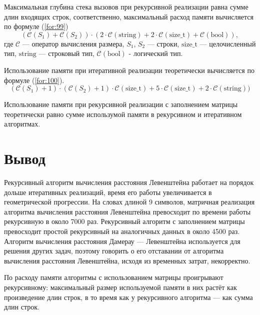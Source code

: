 Максимальная глубина стека вызовов при рекурсивной реализации равна сумме длин входящих строк, соответственно, максимальный расход памяти вычисляется по формуле (\ref{for:99})
\begin{equation}
(\mathcal{C}(S_1) + \mathcal{C}(S_2)) \cdot (2 \cdot \mathcal{C}\mathrm{(string)} + 2 \cdot \mathcal{C}\mathrm{(size\_t)} + \mathcal{C}\mathrm{(bool)}),
\label{for:99}
\end{equation}
где $\mathcal{C}$ — оператор вычисления размера, $S_1$, $S_2$ — строки, $\mathrm{size\_t}$ \cite{sizet} — целочисленный тип, $\mathrm{string}$ — строковый тип,  $\mathcal{C}\mathrm{(bool)}$ - логический тип.

Использование памяти при итеративной реализации теоретически вычисляется по формуле (\ref{for:100}).
\begin{equation}
(\mathcal{C}(S_1) + 1) \cdot (\mathcal{C}(S_2) + 1) \cdot \mathcal{C}\mathrm{(size\_t)} + 5\cdot \mathcal{C}\mathrm{(size\_t)} + 2 \cdot \mathcal{C}\mathrm{(string)})
\label{for:100}
\end{equation}

Использование памяти при рекурсивной реализации с заполнением матрицы теоретически равно сумме использумой памяти в рекурсивном и итеративном алгоритмах.

\section*{Вывод}

Рекурсивный алгоритм вычисления расстояния Левенштейна работает на порядок дольше итеративных реализаций, время его работы увеличивается в геометрической прогрессии. На словах длиной 9 символов, матричная реализация алгоритма вычисления расстояния Левенштейна превосходит по времени работы рекурсивную в около 7000 раз. Рекурсивный алгоритм с заполнением матрицы превосходит простой рекурсивный на аналогичных данных в около 4500 раз. Алгоритм вычисления расстояния Дамерау — Левенштейна используется для решения других задач, поэтому говорить о его отставании от алгоритма вычисления расстояния Левенштейна, исходя из временных затрат, некорректно.

По расходу памяти алгоритмы с использованием матрицы проигрывают рекурсивному: максимальный размер используемой памяти в них растёт как произведение длин строк, в то время как у рекурсивного алгоритма — как сумма длин строк.

